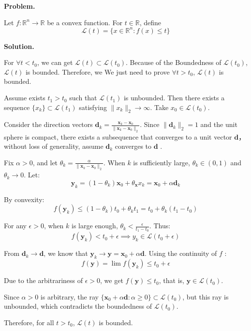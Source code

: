 \documentclass[12pt, a4paper, oneside]{ctexart}
\newcounter{problemname}
\newenvironment{problem}{\begin{shaded}\stepcounter{problemname}\par\noindent\textbf{Problem\arabic{problemname}. }}{\end{shaded}\par}
\newenvironment{solution}{\par\noindent\textbf{Solution. }}{\par}
\begin{document}
\begin{problem}
	
\noindent Let $ f:\mathbb{R}^n \to \mathbb{R} $ be a convex function. For $ t \in \mathbb{R} $, define
$$ \mathcal{L}(t)=\{x \in \mathbb{R}^n: f(x) \leq t\} $$

\end{problem}

\begin{solution}
	
For $\forall t < t_0$, we can get $\mathcal{L}(t)\subset \mathcal{L}(t_0)$. Because of the Boundedness of $\mathcal{L}(t_0)$, $\mathcal{L}(t)$ is bounded. Therefore, we We just need to prove $\forall t > t_0$, $\mathcal{L}(t)$ is bounded.

Assume exists \( t_1 > t_0 \) such that \( \mathcal{L}(t_1) \) is unbounded. Then there exists a sequence \( \{x_k\} \subset \mathcal{L}(t_1) \) satisfying \( \|x_k\|_2 \to \infty \). Take \( x_0 \in \mathcal{L}(t_0) \).

Consider the direction vectors \( \mathbf{d}_k=\frac{\mathbf{x}_k - \mathbf{x}_0}{\|\mathbf{x}_k - \mathbf{x}_0\|_2} \). Since \( \|\mathbf{d}_k\|_2 = 1 \) and the unit sphere is compact, there exists a subsequence that converges to a unit vector \( \mathbf{d} \)，without loss of generality, assume $ \mathbf{d}_k $ converges to \( \mathbf{d} \) .

Fix \( \alpha>0 \), and let \( \theta_k=\frac{\alpha}{\|\mathbf{x}_k - \mathbf{x}_0\|_2} \). When \( k \) is sufficiently large, \( \theta_k\in(0, 1) \) and \( \theta_k\to0 \). Let:
\[\mathbf{y}_k=(1 - \theta_k)\mathbf{x}_0+\theta_\mathbf{x}x_k=\mathbf{x}_0+\alpha \mathbf{d}_k\]

By convexity:
\[f(\mathbf{y}_k)\leq(1 - \theta_k)t_0+\theta_kt_1=t_0+\theta_k(t_1 - t_0)\]

For any \( \epsilon>0 \), when \( k \) is large enough, \( \theta_k<\frac{\epsilon}{t_1 - t_0} \). Thus:
\[f(\mathbf{y}_k)<t_0+\epsilon\implies y_k\in\mathcal{L}(t_0 + \epsilon)\]

From \( \mathbf{d}_k\to \mathbf{d} \), we know that \( \mathbf{y}_k\to \mathbf{y} = \mathbf{x}_0+\alpha \mathbf{d} \). Using the continuity of \( f \) :
\[f(\mathbf{y})=\lim f(\mathbf{y}_k)\leq t_0+\epsilon\]

Due to the arbitrariness of \( \epsilon>0 \), we get \( f(\mathbf{y})\leq t_0 \), that is, \( \mathbf{y}\in\mathcal{L}(t_0) \).

Since \( \alpha>0 \) is arbitrary, the ray \( \{\mathbf{x}_0+\alpha \mathbf{d}:\alpha\geq0\}\subset\mathcal{L}(t_0) \), but this ray is unbounded, which contradicts the boundedness of \( \mathcal{L}(t_0) \).


Therefore, for all $t>t_0$, $\mathcal{L}(t)$ is bounded.

\end{solution}
\end{document}
